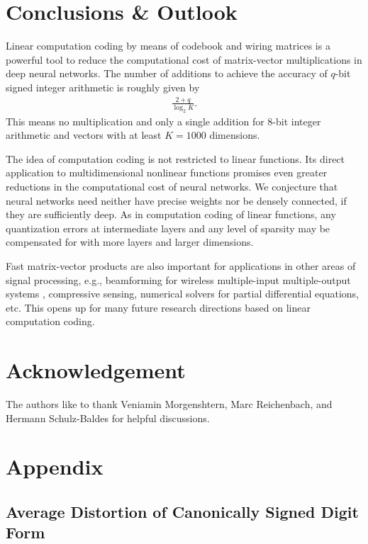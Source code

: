 \documentclass[twocolumn]{IEEEtran}
\begin{document}
\section{Conclusions \& Outlook}
\label{conc}

Linear computation coding by means of codebook and wiring matrices is a powerful tool to reduce the computational cost of matrix-vector multiplications in deep neural networks.
The number of additions to achieve the accuracy of $q$-bit signed integer arithmetic is roughly given by
\begin{align}
\frac {2+q}{\log_2 K}.
\end{align}
This means no multiplication and only a single addition for 8-bit integer arithmetic and vectors with at least $K=1000$ dimensions.  

The idea of computation coding is not restricted to linear functions. Its direct application to multidimensional nonlinear functions promises even greater reductions in the computational cost of neural networks. We conjecture that neural networks need neither have precise weights nor be densely connected, if they are sufficiently deep. As in computation coding of linear functions, any quantization errors at intermediate layers and any level of sparsity may be compensated for with more layers and larger dimensions.

Fast matrix-vector products are also important for applications in other areas of signal processing, e.g., beamforming for wireless multiple-input multiple-output systems \cite{castaneda:20}, compressive sensing, numerical solvers for partial differential equations, etc. This opens up for many future research directions based on linear computation coding.  


\section*{Acknowledgement}
The authors like to thank Veniamin Morgenshtern, Marc Reichenbach, and Hermann Schulz-Baldes for helpful discussions.

\section*{Appendix}

\subsection*{Average Distortion of Canonically Signed Digit Form}
\end{document}
